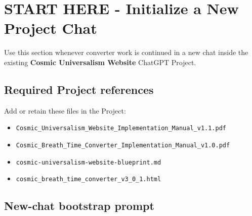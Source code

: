\documentclass[11pt,letterpaper]{article}
\newcommand{\filepath}[1]{\texttt{#1}}
\begin{document}
\clearpage
\tableofcontents
\clearpage

\section*{START HERE - Initialize a New Project Chat}

Use this section whenever converter work is continued in a new chat inside
the existing \textbf{Cosmic Universalism Website} ChatGPT Project.

\subsection*{Required Project references}

Add or retain these files in the Project:

\begin{itemize}
    \item \filepath{Cosmic\_Universalism\_Website\_Implementation\_Manual\_v1.1.pdf}
    \item \filepath{Cosmic\_Breath\_Time\_Converter\_Implementation\_Manual\_v1.0.pdf}
    \item \filepath{cosmic-universalism-website-blueprint.md}
    \item \filepath{cosmic\_breath\_time\_converter\_v3\_0\_1.html}
\end{itemize}

\subsection*{New-chat bootstrap prompt}
\end{document}
